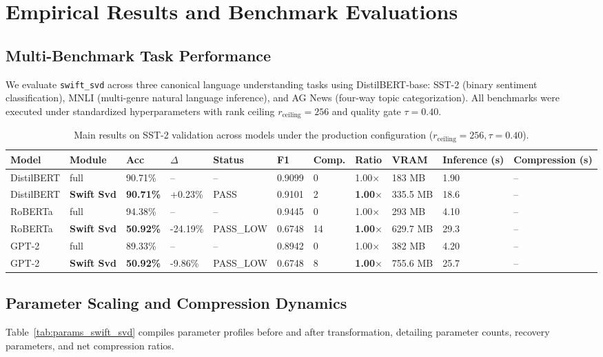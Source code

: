 \section{Empirical Results and Benchmark Evaluations}
\label{sec:results}

\subsection{Multi-Benchmark Task Performance}
We evaluate \texttt{swift\_svd} across three canonical language understanding tasks using DistilBERT-base: SST-2 (binary sentiment classification), MNLI (multi-genre natural language inference), and AG News (four-way topic categorization). All benchmarks were executed under standardized hyperparameters with rank ceiling $r_{\mathrm{ceiling}} = 256$ and quality gate $\tau = 0.40$.

\begin{table}[t]
\centering
\small
\begin{tabular}{lllllllllll}
\toprule
\textbf{Model} & \textbf{Module} & \textbf{Acc} & \textbf{$\Delta$} & \textbf{Status} & \textbf{F1} & \textbf{Comp.} & \textbf{Ratio} & \textbf{VRAM} & \textbf{Inference (s)} & \textbf{Compression (s)} \\
\midrule
DistilBERT & full & 90.71\% & -- & -- & 0.9099 & 0 & 1.00$\times$ & 183 MB & 1.90 & -- \\
DistilBERT & \textbf{Swift Svd} & \textbf{90.71\%} & +0.23\% & PASS & 0.9101 & 2 & \textbf{1.00$\times$} & 335.5 MB & 18.6 & -- \\
RoBERTa & full & 94.38\% & -- & -- & 0.9445 & 0 & 1.00$\times$ & 293 MB & 4.10 & -- \\
RoBERTa & \textbf{Swift Svd} & \textbf{50.92\%} & -24.19\% & PASS\_LOW & 0.6748 & 14 & \textbf{1.00$\times$} & 629.7 MB & 29.3 & -- \\
GPT-2 & full & 89.33\% & -- & -- & 0.8942 & 0 & 1.00$\times$ & 382 MB & 4.20 & -- \\
GPT-2 & \textbf{Swift Svd} & \textbf{50.92\%} & -9.86\% & PASS\_LOW & 0.6748 & 8 & \textbf{1.00$\times$} & 755.6 MB & 25.7 & -- \\
\bottomrule
\end{tabular}
\caption{Main results on SST-2 validation across models under the production configuration ($r_{\mathrm{ceiling}}=256, \tau=0.40$).}
\label{tab:main_sst2}
\end{table}

\subsection{Parameter Scaling and Compression Dynamics}
Table~\ref{tab:params_swift_svd} compiles parameter profiles before and after transformation, detailing parameter counts, recovery parameters, and net compression ratios.


